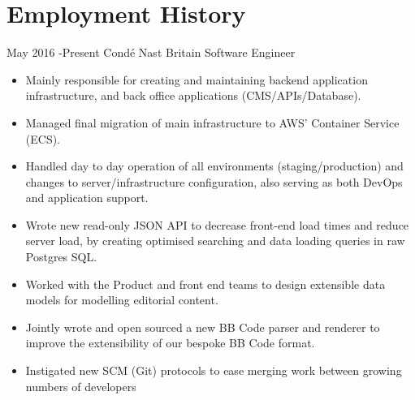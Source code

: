 \documentclass[10pt]{article} %
\begin{document}

\section{Employment History}


\jobheader
{May 2016 -}{Present}
{Condé Nast Britain}
{Software Engineer}
\vspace{-1cm}
  \begin{itemize}

  \item Mainly responsible for creating and maintaining backend application infrastructure,
        and back office applications (CMS/APIs/Database).

  \item Managed final migration of main infrastructure to AWS' Container Service (ECS).

  \item Handled day to day operation of all environments (staging/production) and changes
        to server/infrastructure configuration, also serving as both DevOps and application support.

  \item Wrote new read-only JSON API to decrease front-end load times and reduce server
        load, by creating optimised searching and data loading queries in raw Postgres SQL.

  \item Worked with the Product and front end teams to design extensible data models for modelling
        editorial content.

  \item Jointly wrote and open sourced a new BB Code parser and renderer to improve
        the extensibility of our bespoke BB Code format.

  \item Instigated new SCM (Git) protocols to ease merging work between growing numbers of developers

  \end{itemize}
\end{document}
